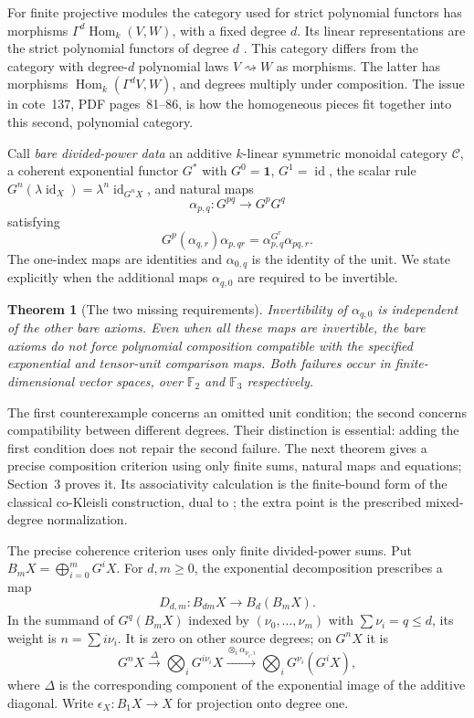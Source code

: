 \documentclass[11pt,a4paper]{article}
\newtheorem{theorem}{Theorem}[section]
\theoremstyle{definition}
\newcommand{\Hom}{\operatorname{Hom}}
\newcommand{\id}{\operatorname{id}}
\newcommand{\F}{\mathbb F}
\begin{document}
For finite projective modules the category used for strict polynomial functors has morphisms $\Gamma^d\Hom_k(V,W)$, with a fixed degree $d$. Its linear representations are the strict polynomial functors of degree $d$ \cite[Section~2, pp.~3--5]{Krause}. This category differs from the category with degree-$d$ polynomial laws $V\rightsquigarrow W$ as morphisms. The latter has morphisms $\Hom_k(\Gamma^dV,W)$, and degrees multiply under composition. The issue in cote~137, PDF pages~81--86, is how the homogeneous pieces fit together into this second, polynomial category.

Call \emph{bare divided-power data} an additive $k$-linear symmetric monoidal category $\mathcal C$, a coherent exponential functor $G^*$ with $G^0=\mathbf1$, $G^1=\id$, the scalar rule $G^n(\lambda\id_X)=\lambda^n\id_{G^nX}$, and natural maps
\[
 \alpha_{p,q}:G^{pq}\longrightarrow G^pG^q
\]
satisfying
\begin{equation}\label{eq:homogeneous}
 G^p(\alpha_{q,r})\alpha_{p,qr}
 =\alpha_{p,q}^{G^r}\alpha_{pq,r}.
\end{equation}
The one-index maps are identities and $\alpha_{0,q}$ is the identity of the unit. We state explicitly when the additional maps $\alpha_{q,0}$ are required to be invertible.

\begin{theorem}[The two missing requirements]\label{thm:bare}
Invertibility of $\alpha_{q,0}$ is independent of the other bare axioms. Even when all these maps are invertible, the bare axioms do not force polynomial composition compatible with the specified exponential and tensor-unit comparison maps. Both failures occur in finite-dimensional vector spaces, over $\F_2$ and $\F_3$ respectively.
\end{theorem}

The first counterexample concerns an omitted unit condition; the second concerns compatibility between different degrees. Their distinction is essential: adding the first condition does not repair the second failure. The next theorem gives a precise composition criterion using only finite sums, natural maps and equations; Section~3 proves it. Its associativity calculation is the finite-bound form of the classical co-Kleisli construction, dual to \cite[Definition~5.2.10, p.~194]{Riehl}; the extra point is the prescribed mixed-degree normalization.

The precise coherence criterion uses only finite divided-power sums. Put $B_mX=\bigoplus_{i=0}^mG^iX$. For $d,m\ge0$, the exponential decomposition prescribes a map
\[
 D_{d,m}:B_{dm}X\longrightarrow B_d(B_mX).
\]
In the summand of $G^q(B_mX)$ indexed by $(\nu_0,\ldots,\nu_m)$ with $\sum\nu_i=q\le d$, its weight is $n=\sum i\nu_i$. It is zero on other source degrees; on $G^nX$ it is
\[
 G^nX\xrightarrow{\Delta}\bigotimes_iG^{i\nu_i}X
 \xrightarrow{\otimes_i\alpha_{\nu_i,i}}\bigotimes_iG^{\nu_i}(G^iX),
\]
where $\Delta$ is the corresponding component of the exponential image of the additive diagonal. Write $\epsilon_X:B_1X\to X$ for projection onto degree one.
\end{document}
